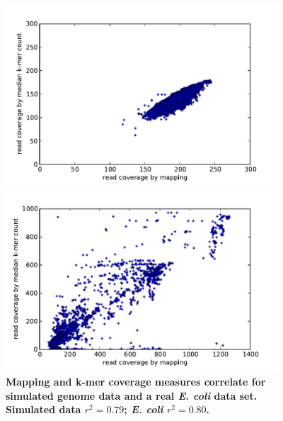 \documentclass[10pt]{article}
\begin{document}
\begin{figure}[!ht]
\begin{center}
\centerline{\includegraphics[width=4in]{diginorm-sim-genome.pdf}}
\centerline{\includegraphics[width=4in]{diginorm-ecoli-genome.pdf}}
\end{center}
\caption{
{\bf Mapping and k-mer coverage measures correlate for simulated genome
data and a real {\em E. coli} data set.  Simulated data $r^2 = 0.79$; {\em
E. coli} $r^2 = 0.80$.}
}
\label{fig:random}
\end{figure}
\end{document}
